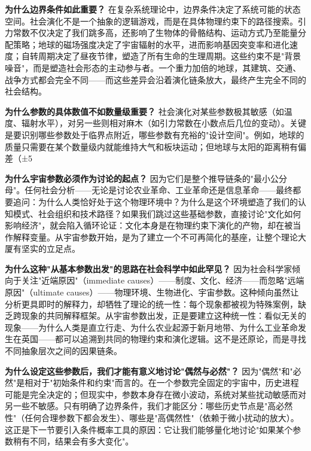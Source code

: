 \documentclass[openany]{book} %
\begin{document}
	\textbf{为什么边界条件如此重要？} 在复杂系统理论中，边界条件决定了系统可能的状态空间。社会演化不是一个抽象的逻辑游戏，而是在具体物理约束下的路径搜索。引力常数不仅决定了我们跳多高，还影响了生物体的骨骼结构、运动方式乃至能量分配策略；地球的磁场强度决定了宇宙辐射的水平，进而影响基因突变率和进化速度；自转周期决定了昼夜节律，塑造了所有生命的生理周期。这些约束不是"背景噪音"，而是塑造社会形态的主动参与者。一个重力加倍的地球，其建筑、交通、战争方式都会完全不同——而这些差异会沿着演化链条放大，最终产生完全不同的社会结构。
	
	\textbf{为什么参数的具体数值不如数量级重要？} 社会演化对某些参数极其敏感（如温度、辐射水平），对另一些则相对麻木（如引力常数在小数点后几位的变动）。关键是要识别哪些参数处于临界点附近，哪些参数有充裕的"设计空间"。例如，地球的质量只需要在某个数量级内就能维持大气和板块运动；但地球与太阳的距离稍有偏差（±5%
	
	\textbf{为什么宇宙参数必须作为讨论的起点？} 因为它们是整个推导链条的"最小公分母"。任何社会分析——无论是讨论农业革命、工业革命还是信息革命——最终都要追问：为什么人类恰好处于这个物理环境中？为什么是这个环境塑造了我们的认知模式、社会组织和技术路径？如果我们跳过这些基础参数，直接讨论"文化如何影响经济"，就会陷入循环论证：文化本身是在物理约束下演化的产物，却在被当作解释变量。从宇宙参数开始，是为了建立一个不可再简化的基座，让整个理论大厦有坚实的立足点。
	
	\textbf{为什么这种"从基本参数出发"的思路在社会科学中如此罕见？} 因为社会科学家倾向于关注"近端原因"（immediate causes）——制度、文化、经济——而忽略"远端原因"（ultimate causes）——物理环境、生物进化、宇宙参数。这种倾向虽然让分析更具即时的解释力，却牺牲了理论的统一性：每个现象都被视为特殊案例，缺乏跨现象的共同解释框架。从宇宙参数出发，正是要建立这种统一性：看似无关的现象——为什么人类是直立行走、为什么农业起源于新月地带、为什么工业革命发生在英国——都可以追溯到共同的物理约束和演化逻辑。这不是还原论，而是寻找不同抽象层次之间的因果链条。
	
	\textbf{为什么设定这些参数后，我们才能有意义地讨论"偶然与必然"？} 因为"偶然"和"必然"是相对于"初始条件和约束"而言的。在一个参数完全固定的宇宙中，历史进程可能是完全决定的；但现实中，参数本身存在微小波动，系统对某些扰动敏感而对另一些不敏感。只有明确了边界条件，我们才能区分：哪些历史节点是"高必然性"（任何合理参数下都会发生）、哪些是"高偶然性"（依赖于微小扰动的放大）。这正是下一节要引入条件概率工具的原因：它让我们能够量化地讨论"如果某个参数稍有不同，结果会有多大变化"。
	
\end{document}
